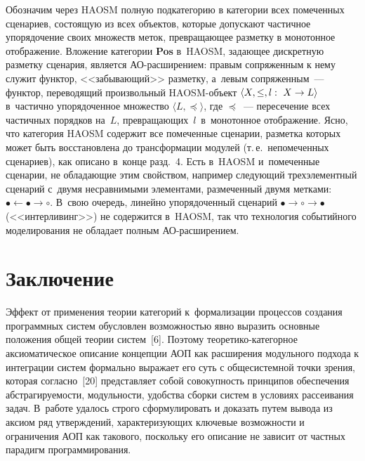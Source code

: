 \begin{multicols}{2}
Обозначим через HAOSM полную подкатегорию в категории всех
помеченных сценариев, состоящую из всех объектов, которые допускают
частичное упорядочение своих множеств меток, пре\-вра\-ща\-ющее разметку в
монотонное отображение. Вложение категории \textbf{Pos} в~HAOSM,
задающее дискретную разметку сценария, является
 АО-рас\-ши\-ре\-ни\-ем: правым сопряженным к нему служит функтор,
<<за\-бы\-ва\-ющий>> разметку, а~левым сопряженным~--- функтор, переводящий
произвольный HAOSM-объ\-ект $\langle X, \leq, l:\ X \hm\to L\rangle$
в~частично упорядоченное мно\-же\-ст\-во $\langle L, \preceq\rangle$, где
$\preceq$~--- пересечение всех частичных порядков на~$L$,
пре\-вра\-ща\-ющих~$l$~в~монотонное отоб\-ра\-же\-ние. Ясно, что категория HAOSM
содержит все помеченные сценарии, разметка которых может быть
восстановлена до трансформации модулей (т.\,е.\ непомеченных сценариев), как
описано в~конце разд.~4. Есть в~HAOSM и~помеченные сценарии, не
облада\-ющие этим свойством, например следующий трехэлементный сценарий
с~двумя несравнимыми элементами, размеченный двумя метками: $\bullet
\leftarrow\bullet\rightarrow\circ$. В~свою очередь, линейно упорядоченный
сценарий $\bullet\to\circ\to\bullet$ (<<интерливинг>>) не содержится
в~HAOSM, так что технология событийного моделирования не обладает
полным АО-рас\-ши\-ре\-нием.

\section{Заключение}

 Эффект от применения теории категорий к~фор\-ма\-лизации процессов
создания программных систем обусловлен возможностью явно выразить
основные положения общей теории систем~[6]. \mbox{Поэтому}
 тео\-ре\-ти\-ко-ка\-те\-гор\-ное аксиоматическое описание концепции АОП
как расширения модульного подхода к интеграции систем формально выражает
его суть с общесистемной точки зрения, которая согласно~[20] представляет
собой совокупность принципов обеспечения абстрагируемости, модульности,
удобства сборки систем в условиях рассеивания задач. В~работе удалось строго
сформулировать и доказать путем вывода из аксиом ряд утверждений,
характеризующих ключевые возможности и ограничения АОП как такового,
поскольку его описание не зависит от частных парадигм программирования.


\end{multicols}
